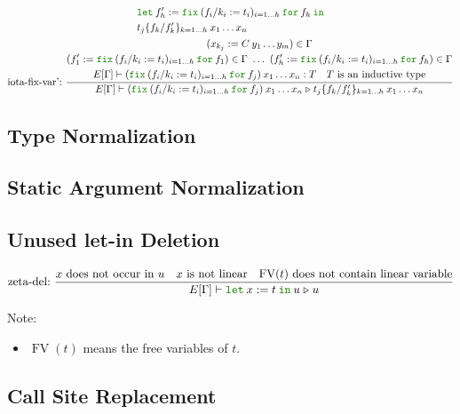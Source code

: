 \documentclass[a4paper,fleqn]{article}
\newcommand{\kwlet}{\mbox{\color{mygreen}\ttfamily let}}
\newcommand{\kwin}{\mbox{\color{mygreen}\ttfamily in}}
\newcommand{\kwfix}{\mbox{\color{mygreen}\ttfamily fix}}
\newcommand{\kwfor}{\mbox{\color{mygreen}\ttfamily for}}
\newcommand{\letin}[3]{\kwlet\:#1:=#2\:\kwin\:#3}
\newcommand{\letinB}[2]{\kwlet\:#1:=#2\:\kwin}
\newcommand{\fix}[4]{\kwfix\:(#1 := #2)_{#3}\:\kwfor\:#4}
\DeclareMathOperator{\FV}{FV}
\newcommand{\subst}[3]{#1\{#2/#3\}}
\newcommand{\reltri}{\mathrel{\triangleright}}
\begin{document}
\begin{gather*}
{\begin{aligned}
\begin{aligned}[t]
          & \letinB{f'_h}{\fix{f_i/k_i}{t_i}{i=1\ldots h}{f_h}} \\
          & \subst{t_j}{f_k}{f'_k}_{k=1\ldots h} \:x_1 \ldots x_n
          \end{aligned}
      \end{aligned}
    } \\
  \text{iota-fix-var':}~
    \dfrac
    {
      \begin{gathered}
        (x_{k_j} := C\:y_1\ldots y_m) \in \Gamma \\
        (f'_1 := \fix{f_i/k_i}{t_i}{i=1\ldots h}{f_1}) \in \Gamma ~\ldots~
        (f'_h := \fix{f_i/k_i}{t_i}{i=1\ldots h}{f_h}) \in \Gamma \\
        E[\Gamma] \vdash (\fix{f_i/k_i}{t_i}{i=1\ldots h}{f_j})\:x_1\ldots x_n : T \quad
        \text{$T$ is an inductive type}
      \end{gathered}
    }{
      E[\Gamma] \vdash
      (\fix{f_i/k_i}{t_i}{i=1\ldots h}{f_j})\:x_1\ldots x_n
      \reltri
      \subst{t_j}{f_k}{f'_k}_{k=1\ldots h} \:x_1 \ldots x_n
    }
\end{gather*}

\subsection{Type Normalization}\label{sec:type-normalization}
\subsection{Static Argument Normalization}\label{sec:static-argument-normalization}
\subsection{Unused let-in Deletion}\label{sec:let-in-deletion}
\begin{gather*}
  \text{zeta-del:}~
    \dfrac{
      \text{$x$ does not occur in $u$} \quad \text{$x$ is not linear} \quad \text{$\FV(t)$ does not contain linear variable}
    }{E[\Gamma] \vdash \letin{x}{t}{u}
                       \reltri
                       u
    }
\end{gather*}
{\small Note:
\begin{itemize}
  \item $\FV(t)$ means the free variables of $t$.
\end{itemize}}

\subsection{Call Site Replacement}\label{sec:call-site-replacement}
\end{document}

